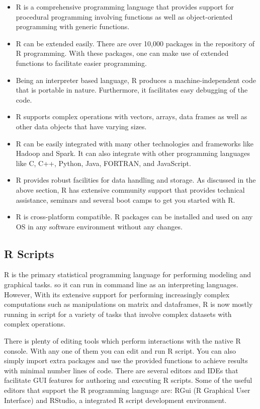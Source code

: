 \documentclass[
]{book}
\providecommand{\tightlist}{%
  \setlength{\itemsep}{0pt}\setlength{\parskip}{0pt}}
\begin{document}
\begin{itemize}
\tightlist
\item
  R is a comprehensive programming language that provides support for procedural programming involving functions as well as object-oriented programming with generic functions.
\item
  R can be extended easily. There are over 10,000 packages in the repository of R programming. With these packages, one can make use of extended functions to facilitate easier programming.
\item
  Being an interpreter based language, R produces a machine-independent code that is portable in nature. Furthermore, it facilitates easy debugging of the code.
\item
  R supports complex operations with vectors, arrays, data frames as well as other data objects that have varying sizes.
\item
  R can be easily integrated with many other technologies and frameworks like Hadoop and Spark. It can also integrate with other programming languages like C, C++, Python, Java, FORTRAN, and JavaScript.
\item
  R provides robust facilities for data handling and storage.
  As discussed in the above section, R has extensive community support that provides technical assistance, seminars and several boot camps to get you started with R.
\item
  R is cross-platform compatible. R packages can be installed and used on any OS in any software environment without any changes.
\end{itemize}

\hypertarget{r-scripts}{%
\subsection{R Scripts}\label{r-scripts}}

R is the primary statistical programming language for performing modeling and graphical tasks. so it can run in command line as an interpreting languages. However, With its extensive support for performing increasingly complex computations such as manipulations on matrix and dataframes, R is now mostly running in script for a variety of tasks that involve complex datasets with complex operations.

There is plenty of editing tools which perform interactions with the native R console. With any one of them you can edit and run R script. You can also simply import extra packages and use the provided functions to achieve results with minimal number lines of code. There are several editors and IDEs that facilitate GUI features for authoring and executing R scripts. Some of the useful editors that support the R programming language are: RGui (R Graphical User Interface) and RStudio, a integrated R script development environment.
\end{document}
